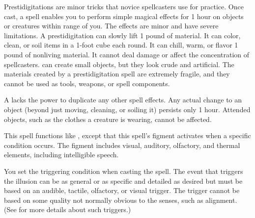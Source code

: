 \begin{spelleffect}
Prestidigitations are minor tricks that novice spellcasters use for practice. Once cast, a  spell enables you to perform simple magical effects for 1 hour on objects or creatures within \rngclose range of you. The effects are minor and have severe limitations. A prestidigitation can slowly lift 1 pound of material. It can color, clean, or soil items in a 1-foot cube each round. It can chill, warm, or flavor 1 pound of nonliving material. It cannot deal damage or affect the concentration of spellcasters.  can create small objects, but they look crude and artificial. The materials created by a prestidigitation spell are extremely fragile, and they cannot be used as tools, weapons, or spell components.
\end{spelleffect}
\begin{spellnotes}
A  lacks the power to duplicate any other spell effects. Any actual change to an object (beyond just moving, cleaning, or soiling it) persists only 1 hour. Attended objects, such as the clothes a creature is wearing, cannot be affected.
\end{spellnotes}

\begin{spelleffect}
This spell functions like , except that this spell's figment activates when a specific condition occurs. The figment includes visual, auditory, olfactory, and thermal elements, including intelligible speech.

You set the triggering condition when casting the spell. The event that triggers the illusion can be as general or as specific and detailed as desired but must be based on an audible, tactile, olfactory, or visual trigger. The trigger cannot be based on some quality not normally obvious to the senses, such as alignment. (See  for more details about such triggers.)
\end{spelleffect}

